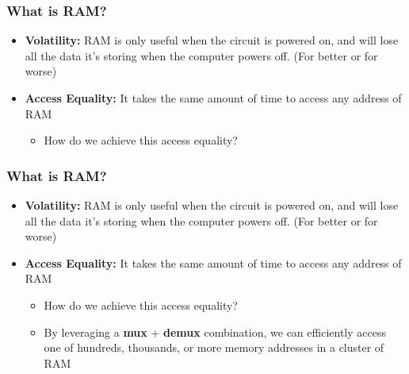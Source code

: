 \documentclass{beamer}
\begin{document}
              \begin{frame}
             	\frametitle{What is RAM?}
             	\begin{itemize}
             		\item \textbf{Volatility:} RAM is only useful when the circuit is powered on, and will lose all the data it's storing when the computer powers off. (For better or for worse)
             		\item \textbf{Access Equality:} It takes the same amount of time to access any address of RAM
             		\begin{itemize}
             			\item How do we achieve this access equality?
             		\end{itemize}
             	\end{itemize}
             \end{frame}
             
             \begin{frame}
             	\frametitle{What is RAM?}
             	\begin{itemize}
             		\item \textbf{Volatility:} RAM is only useful when the circuit is powered on, and will lose all the data it's storing when the computer powers off. (For better or for worse)
             		\item \textbf{Access Equality:} It takes the same amount of time to access any address of RAM
             		\begin{itemize}
             			\item How do we achieve this access equality?
             			\item By leveraging a \textbf{mux} + \textbf{demux} combination, we can efficiently access one of hundreds, thousands, or more memory addresses in a cluster of RAM
             		\end{itemize}
             	\end{itemize}
             \end{frame}
             
\end{document}
